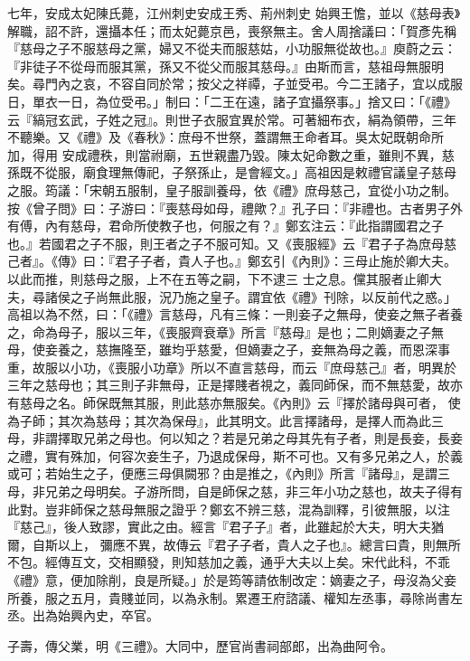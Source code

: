 \begin{pinyinscope}
 七年，安成太妃陳氏薨，江州刺史安成王秀、荊州刺史
 始興王憺，並以《慈母表》解職，詔不許，還攝本任；而太妃薨京邑，喪祭無主。舍人周捨議曰：「賀彥先稱『慈母之子不服慈母之黨，婦又不從夫而服慈姑，小功服無從故也。』庾蔚之云：『非徒子不從母而服其黨，孫又不從父而服其慈母。』由斯而言，慈祖母無服明矣。尋門內之哀，不容自同於常；按父之祥禫，子並受弔。今二王諸子，宜以成服日，單衣一日，為位受弔。」制曰：「二王在遠，諸子宜攝祭事。」捨又曰：「《禮》云『縞冠玄武，子姓之冠』。則世子衣服宜異於常。可著細布衣，絹為領帶，三年不聽樂。又《禮》及《春秋》：庶母不世祭，蓋謂無王命者耳。吳太妃既朝命所加，得用
 安成禮秩，則當祔廟，五世親盡乃毀。陳太妃命數之重，雖則不異，慈孫既不從服，廟食理無傳祀，子祭孫止，是會經文。」高祖因是敕禮官議皇子慈母之服。筠議：「宋朝五服制，皇子服訓養母，依《禮》庶母慈己，宜從小功之制。按《曾子問》曰：子游曰：『喪慈母如母，禮歟？』孔子曰：『非禮也。古者男子外有傅，內有慈母，君命所使教子也，何服之有？』鄭玄注云：『此指謂國君之子也。』若國君之子不服，則王者之子不服可知。又《喪服經》云『君子子為庶母慈己者』。《傳》曰：『君子子者，貴人子也。』鄭玄引《內則》：三母止施於卿大夫。以此而推，則慈母之服，上不在五等之嗣，下不逮三
 士之息。儻其服者止卿大夫，尋諸侯之子尚無此服，況乃施之皇子。謂宜依《禮》刊除，以反前代之惑。」高祖以為不然，曰：「《禮》言慈母，凡有三條：一則妾子之無母，使妾之無子者養之，命為母子，服以三年，《喪服齊衰章》所言『慈母』是也；二則嫡妻之子無母，使妾養之，慈撫隆至，雖均乎慈愛，但嫡妻之子，妾無為母之義，而恩深事重，故服以小功，《喪服小功章》所以不直言慈母，而云『庶母慈己』者，明異於三年之慈母也；其三則子非無母，正是擇賤者視之，義同師保，而不無慈愛，故亦有慈母之名。師保既無其服，則此慈亦無服矣。《內則》云『擇於諸母與可者，
 使為子師；其次為慈母；其次為保母』，此其明文。此言擇諸母，是擇人而為此三母，非謂擇取兄弟之母也。何以知之？若是兄弟之母其先有子者，則是長妾，長妾之禮，實有殊加，何容次妾生子，乃退成保母，斯不可也。又有多兄弟之人，於義或可；若始生之子，便應三母俱闕邪？由是推之，《內則》所言『諸母』，是謂三母，非兄弟之母明矣。子游所問，自是師保之慈，非三年小功之慈也，故夫子得有此對。豈非師保之慈母無服之證乎？鄭玄不辨三慈，混為訓釋，引彼無服，以注『慈己』，後人致謬，實此之由。經言『君子子』者，此雖起於大夫，明大夫猶爾，自斯以上，
 彌應不異，故傳云『君子子者，貴人之子也』。總言曰貴，則無所不包。經傳互文，交相顯發，則知慈加之義，通乎大夫以上矣。宋代此科，不乖《禮》意，便加除削，良是所疑。」於是筠等請依制改定：嫡妻之子，母沒為父妾所養，服之五月，貴賤並同，以為永制。累遷王府諮議、權知左丞事，尋除尚書左丞。出為始興內史，卒官。



 子壽，傳父業，明《三禮》。大同中，歷官尚書祠部郎，出為曲阿令。




\end{pinyinscope}
